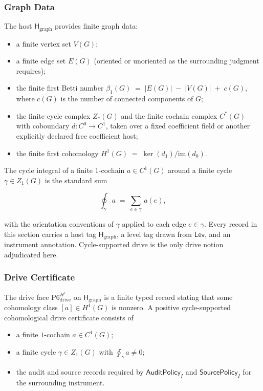 \documentclass[11pt]{article}
\providecommand{\tightlist}{}
\theoremstyle{definition}
\begin{document}
\subsubsection{Graph Data}

The host \(\mathsf H_{\mathrm{graph}}\) provides finite graph data:

\begin{itemize}
\tightlist
\item
  a finite vertex set \(V(G)\);
\item
  a finite edge set \(E(G)\) (oriented or unoriented as the surrounding judgment requires);
\item
  the finite first Betti number \(\beta_1(G)\;=\;|E(G)|\;-\;|V(G)|\;+\;c(G)\), where \(c(G)\) is the number of connected components of \(G\);
\item
  the finite cycle complex \(Z_*(G)\) and the finite cochain complex \(C^*(G)\) with coboundary \(d:C^0\to C^1\), taken over a fixed coefficient field or another explicitly declared free coefficient host;
\item
  the finite first cohomology \(H^1(G)\;=\;\ker(d_1)/\mathrm{im}(d_0)\).
\end{itemize}

The cycle integral of a finite \(1\)-cochain \(a\in C^1(G)\) around a finite cycle \(\gamma\in Z_1(G)\) is the standard sum

\[
\oint_\gamma a\;=\;\sum_{e\in\gamma}\,a(e),
\]

with the orientation conventions of \(\gamma\) applied to each edge \(e\in\gamma\). Every record in this section carries a host tag \(\mathsf H_{\mathrm{graph}}\), a level tag drawn from \(\mathsf{Lev}\), and an instrument annotation. Cycle-supported drive is the only drive notion adjudicated here.

\subsubsection{Drive Certificate}

The drive face \(\mathrm{P6}_{\mathrm{drive}}^{H^1}\) on \(\mathsf H_{\mathrm{graph}}\) is a finite typed record stating that some cohomology class \([a]\in H^1(G)\) is nonzero. A positive cycle-supported cohomological drive certificate consists of

\begin{itemize}
\tightlist
\item
  a finite \(1\)-cochain \(a\in C^1(G)\);
\item
  a finite cycle \(\gamma\in Z_1(G)\) with \(\oint_\gamma a\neq 0\);
\item
  the audit and source records required by \(\mathsf{AuditPolicy}_I\) and \(\mathsf{SourcePolicy}_I\) for the surrounding instrument.
\end{itemize}
\end{document}

